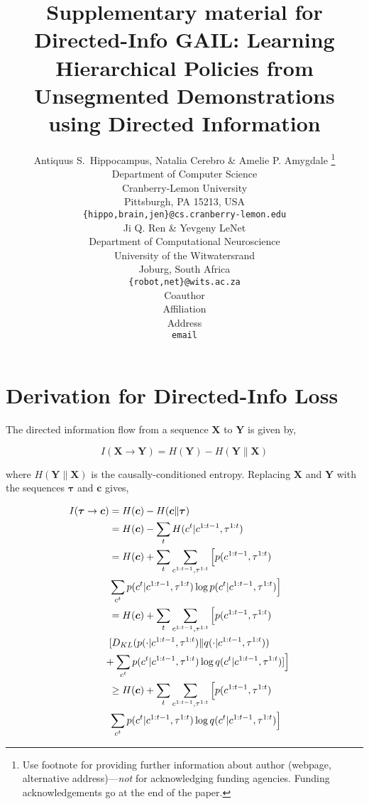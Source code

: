 \documentclass{article} %
\title{Supplementary material for Directed-Info GAIL: Learning Hierarchical Policies from Unsegmented Demonstrations using Directed Information}
\author{Antiquus S.~Hippocampus, Natalia Cerebro \& Amelie P. Amygdale \thanks{ Use footnote for providing further information
about author (webpage, alternative address)---\emph{not} for acknowledging
funding agencies.  Funding acknowledgements go at the end of the paper.} \\
Department of Computer Science\\
Cranberry-Lemon University\\
Pittsburgh, PA 15213, USA \\
\texttt{\{hippo,brain,jen\}@cs.cranberry-lemon.edu} \\
\And
Ji Q. Ren \& Yevgeny LeNet \\
Department of Computational Neuroscience \\
University of the Witwatersrand \\
Joburg, South Africa \\
\texttt{\{robot,net\}@wits.ac.za} \\
\AND
Coauthor \\
Affiliation \\
Address \\
\texttt{email}
}
\begin{document}
\maketitle

\section{Derivation for Directed-Info Loss}
The directed information flow from a sequence $\boldsymbol{X}$ to $\boldsymbol{Y}$ is given by,

\begin{equation*}
I(\boldsymbol{X} \rightarrow \boldsymbol{Y}) = H(\boldsymbol{Y}) - H(\boldsymbol{Y} \| \boldsymbol{X})    
\end{equation*}

where $H(\boldsymbol{Y} \| \boldsymbol{X})$ is the causally-conditioned entropy. Replacing $\boldsymbol{X}$ and $\boldsymbol{Y}$ with the sequences $\boldsymbol{\tau}$ and $\boldsymbol{c}$ gives,

\begin{align}
\footnotesize
I(\boldsymbol{\tau} \rightarrow \boldsymbol{c}) &= H(\boldsymbol{c}) - H(\boldsymbol{c} \| \boldsymbol{\tau})& &\nonumber \\
&= H(\boldsymbol{c}) - \sum_{t}H(c^{t}|c^{1:t-1}, \tau^{1:t})& & \nonumber \\
&= H(\boldsymbol{c}) + \sum_{t} \sum_{c^{1:t-1}, \tau^{1:t}} \Big[ p(c^{1:t-1}, \tau^{1:t}) & &\nonumber \\
& \sum_{c^{t}} p(c^{t} | c^{1:t-1}, \tau^{1:t}) \log p(c^{t} | c^{1:t-1}, \tau^{1:t})\Big]  \nonumber \\
&= H(\boldsymbol{c}) + \sum_{t} \sum_{c^{1:t-1}, \tau^{1:t}} \Big[ p(c^{1:t-1}, \tau^{1:t}) & & \nonumber\\
& [D_{KL}(p(\cdot | c^{1:t-1}, \tau^{1:t}) \| q(\cdot | c^{1:t-1}, \tau^{1:t})) \nonumber \\
& \hspace{-5pt}+ \sum_{c^{t}} p(c^{t} | c^{1:t-1}, \tau^{1:t}) \log q(c^{t} | c^{1:t-1}, \tau^{1:t})]\Big]   \nonumber \\
&\geq H(\boldsymbol{c}) + \sum_{t} \sum_{c^{1:t-1}, \tau^{1:t}} \Big[ p(c^{1:t-1}, \tau^{1:t}) & & \nonumber\\
& \sum_{c^{t}} p(c^{t} | c^{1:t-1}, \tau^{1:t}) \log q(c^{t} | c^{1:t-1}, \tau^{1:t})\Big]
\label{eq:directed_info}
\end{align}
\end{document}
